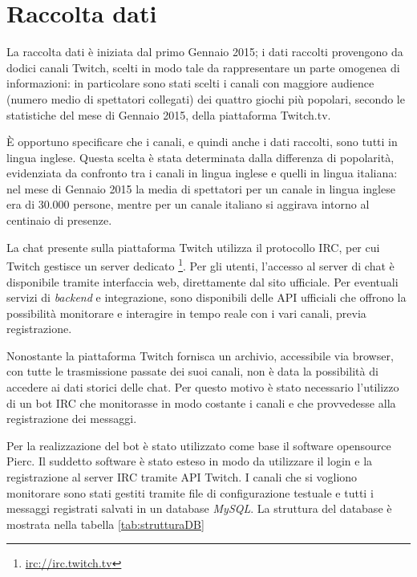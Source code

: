 \documentclass[a4paper,12pt,openright,twoside]{report}
\theoremstyle{definition}
\begin{document}
\section{Raccolta dati}
La raccolta dati è iniziata dal primo Gennaio 2015; i dati raccolti provengono da dodici canali 
Twitch, scelti in modo tale da rappresentare un parte omogenea di informazioni: in particolare sono stati scelti i canali con 
maggiore audience (numero medio di spettatori collegati) dei quattro giochi più popolari, 
secondo le statistiche del mese di Gennaio 2015, della piattaforma Twitch.tv.

È opportuno specificare che i canali, e quindi anche i dati raccolti, 
sono tutti in lingua inglese. Questa scelta è stata determinata dalla 
differenza di popolarità, evidenziata da confronto tra i canali in lingua 
inglese e quelli in lingua italiana: nel mese di Gennaio 2015 la media di 
spettatori per un canale in lingua inglese era di 30.000 persone, 
mentre per un canale italiano si aggirava intorno al centinaio di presenze.

La chat presente sulla piattaforma Twitch utilizza il protocollo IRC, 
per cui Twitch gestisce un server dedicato \footnote{\url{irc://irc.twitch.tv}}. 
Per gli utenti, l’accesso al server di chat è disponibile tramite interfaccia web, 
direttamente dal sito ufficiale. Per eventuali servizi di \emph{backend}
e integrazione, sono disponibili 
delle API ufficiali che offrono la possibilità monitorare e interagire in tempo reale 
con i vari canali, previa registrazione.

Nonostante la piattaforma Twitch fornisca un archivio, accessibile via browser, 
con tutte le trasmissione passate dei suoi canali, 
non è data la possibilità di accedere ai dati storici delle chat. 
Per questo motivo è stato necessario l’utilizzo di un bot IRC che monitorasse in 
modo costante i canali e che provvedesse alla registrazione dei messaggi.

Per la realizzazione del bot è stato utilizzato come base il software opensource Pierc. 
Il suddetto software è stato esteso in modo da utilizzare il login e la registrazione 
al server IRC tramite API Twitch. I canali che si vogliono monitorare sono stati 
gestiti tramite file di configurazione testuale e tutti i messaggi registrati salvati 
in un database \emph{MySQL}. La struttura del database è mostrata nella tabella \ref{tab:strutturaDB}
\end{document}
